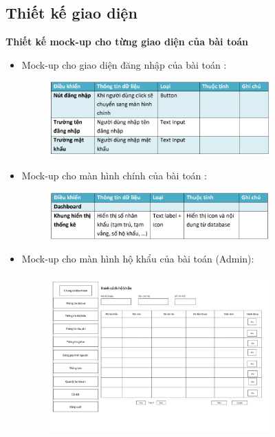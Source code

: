 \documentclass{article}
\begin{document}
\subsection{Thiết kế giao diện}
\textbf{Thiết kế mock-up cho từng giao diện của bài toán}
\begin{itemize}
    \item Mock-up cho giao diện đăng nhập của bài toán :
    \begin{figure}[H]
        \centering
        \includegraphics[width=0.8\textwidth]{Ảnh chương 4/Đăng nhập.png}
    \end{figure}
    \item Mock-up cho màn hình chính của bài toán :
    \begin{figure}[H]
        \centering
        \includegraphics[width=0.8\textwidth]{Ảnh chương 4/Màn hình chính.png}
    \end{figure}
    \vspace{1cm}
    \item Mock-up cho màn hình hộ khẩu của bài toán (Admin):
    \begin{figure}[H]
        \centering
        \includegraphics[width=0.8\textwidth]{Ảnh chương 4/Màn hình hộ khẩu.png}

\end{figure}
\end{itemize}
\end{document}
